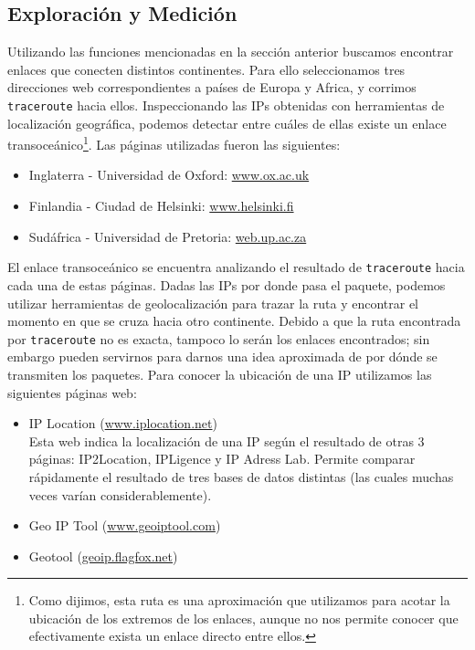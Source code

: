  
 \subsection{Exploraci\'on y Medición}
 
 Utilizando las funciones mencionadas en la secci\'on anterior buscamos encontrar enlaces que conecten distintos continentes. Para ello seleccionamos tres direcciones web correspondientes a pa\'ises de Europa y Africa, y corrimos \texttt{traceroute} hacia ellos. Inspeccionando las IPs obtenidas con herramientas de localización geográfica, podemos detectar entre cuáles de ellas existe un enlace transoceánico\footnote{Como dijimos, esta ruta es una aproximación que utilizamos para acotar la ubicación de los extremos de los enlaces, aunque no nos permite conocer que efectivamente exista un enlace directo entre ellos.}. Las p\'aginas utilizadas fueron las siguientes:
 
 \begin{itemize}
  \item Inglaterra - Universidad de Oxford: \url{www.ox.ac.uk}
  \item Finlandia - Ciudad de Helsinki: \url{www.helsinki.fi}
  \item Sud\'africa - Universidad de Pretoria: \url{web.up.ac.za}
 \end{itemize}
 
 El enlace transoce\'anico se encuentra analizando el resultado de \texttt{traceroute} hacia cada una de estas p\'aginas. Dadas las IPs por donde pasa el paquete, podemos utilizar herramientas de geolocalizaci\'on para trazar la ruta y encontrar el momento en que se cruza hacia otro continente. Debido a que la ruta encontrada por \texttt{traceroute} no es exacta, tampoco lo ser\'an los enlaces encontrados; sin embargo pueden servirnos para darnos una idea aproximada de por d\'onde se transmiten los paquetes. Para conocer la ubicaci\'on de una IP utilizamos las siguientes p\'aginas web:
 
\begin{itemize}
 \item IP Location (\url{www.iplocation.net})\\
 Esta web indica la localizaci\'on de una IP seg\'un el resultado de otras 3 p\'aginas: IP2Location, IPLigence y IP Adress Lab. Permite comparar r\'apidamente el resultado de tres bases de datos distintas (las cuales muchas veces var\'ian considerablemente).
 \item Geo IP Tool (\url{www.geoiptool.com})
 \item Geotool (\url{geoip.flagfox.net})
\end{itemize}

